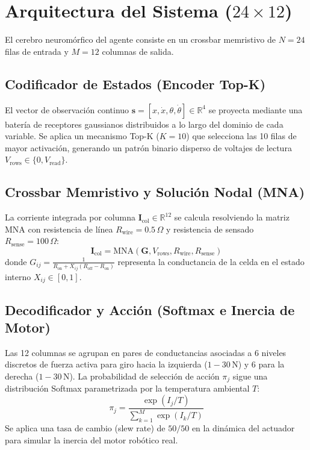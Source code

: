 \documentclass[12pt,a4paper]{article}
\begin{document}
\section{Arquitectura del Sistema ($24 \times 12$)}
El cerebro neuromórfico del agente consiste en un crossbar memristivo de $N=24$ filas de entrada y $M=12$ columnas de salida.

\subsection{Codificador de Estados (Encoder Top-K)}
El vector de observación continuo $\mathbf{s} = [x, \dot{x}, \theta, \dot{\theta}] \in \mathbb{R}^4$ se proyecta mediante una batería de receptores gaussianos distribuidos a lo largo del dominio de cada variable. Se aplica un mecanismo Top-K ($K=10$) que selecciona las 10 filas de mayor activación, generando un patrón binario disperso de voltajes de lectura $V_{\text{rows}} \in \{0, V_{\text{read}}\}$.

\subsection{Crossbar Memristivo y Solución Nodal (MNA)}
La corriente integrada por columna $\mathbf{I}_{\text{col}} \in \mathbb{R}^{12}$ se calcula resolviendo la matriz MNA con resistencia de línea $R_{\text{wire}} = 0.5\,\Omega$ y resistencia de sensado $R_{\text{sense}} = 100\,\Omega$:
\begin{equation}
    \mathbf{I}_{\text{col}} = \text{MNA}(\mathbf{G}, V_{\text{rows}}, R_{\text{wire}}, R_{\text{sense}})
\end{equation}
donde $G_{ij} = \frac{1}{R_{\text{on}} + X_{ij}(R_{\text{off}} - R_{\text{on}})}$ representa la conductancia de la celda en el estado interno $X_{ij} \in [0, 1]$.

\subsection{Decodificador y Acción (Softmax e Inercia de Motor)}
Las 12 columnas se agrupan en pares de conductancias asociadas a 6 niveles discretos de fuerza activa para giro hacia la izquierda ($1 - 30\,\text{N}$) y 6 para la derecha ($1 - 30\,\text{N}$). La probabilidad de selección de acción $\pi_j$ sigue una distribución Softmax parametrizada por la temperatura ambiental $T$:
\begin{equation}
    \pi_j = \frac{\exp(I_j / T)}{\sum_{k=1}^M \exp(I_k / T)}
\end{equation}
Se aplica una tasa de cambio (slew rate) de $50/50$ en la dinámica del actuador para simular la inercia del motor robótico real.
\end{document}

